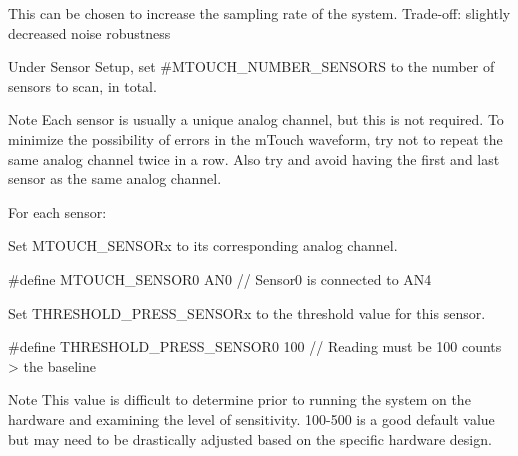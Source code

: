 \begin{DoxyEnumerate}
\begin{DoxyItemize}
\begin{DoxyItemize}
\item This can be chosen to increase the sampling rate of the system. Trade-\/off\+: slightly decreased noise robustness 
\end{DoxyItemize}
\end{DoxyItemize}
\item Under \textquotesingle{}Sensor Setup\textquotesingle{}, set \#\+M\+T\+O\+U\+C\+H\+\_\+\+N\+U\+M\+B\+E\+R\+\_\+\+S\+E\+N\+S\+O\+R\+S to the number of sensors to scan, in total. \begin{DoxyNote}{Note}
Each sensor is usually a unique analog channel, but this is not required. To minimize the possibility of errors in the m\+Touch waveform, try not to repeat the same analog channel twice in a row. Also try and avoid having the first and last sensor as the same analog channel. 
\end{DoxyNote}

\item For each sensor\+: 
\begin{DoxyEnumerate}
\item Set M\+T\+O\+U\+C\+H\+\_\+\+S\+E\+N\+S\+O\+Rx to its corresponding analog channel. 
\begin{DoxyCode}
\textcolor{preprocessor}{#define MTOUCH\_SENSOR0                AN0     // Sensor0 is connected to AN4}
\end{DoxyCode}
 
\item Set T\+H\+R\+E\+S\+H\+O\+L\+D\+\_\+\+P\+R\+E\+S\+S\+\_\+\+S\+E\+N\+S\+O\+Rx to the threshold value for this sensor. 
\begin{DoxyCode}
\textcolor{preprocessor}{#define THRESHOLD\_PRESS\_SENSOR0       100     // Reading must be 100 counts > the baseline}
\end{DoxyCode}
 \begin{DoxyNote}{Note}
This value is difficult to determine prior to running the system on the hardware and examining the level of sensitivity. 100-\/500 is a good default value but may need to be drastically adjusted based on the specific hardware design. 
\end{DoxyNote}


\end{DoxyEnumerate}
\end{DoxyEnumerate}
